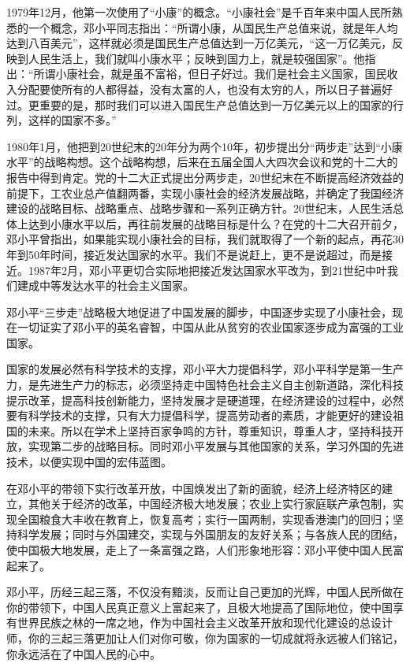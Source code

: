 \documentclass[cs4size,a4paper,nofonts]{ctexart}
\begin{document}
1979年12月，他第一次使用了“小康”的概念。“小康社会”是千百年来中国人民所熟悉的一个概念，邓小平同志指出：“所谓小康，从国民生产总值来说，就是年人均达到八百美元”，这样就必须是国民生产总值达到一万亿美元，“这一万亿美元，反映到人民生活上，我们就叫小康水平；反映到国力上，就是较强国家”。他指出：“所谓小康社会，就是虽不富裕，但日子好过。我们是社会主义国家，国民收入分配要使所有的人都得益，没有太富的人，也没有太穷的人，所以日子普遍好过。更重要的是，那时我们可以进入国民生产总值达到一万亿美元以上的国家的行列，这样的国家不多。”

1980年1月，他把到20世纪末的20年分为两个10年，初步提出分“两步走”达到“小康水平”的战略构想。这个战略构想，后来在五届全国人大四次会议和党的十二大的报告中得到肯定。党的十二大正式提出分两步走，20世纪末在不断提高经济效益的前提下，工农业总产值翻两番，实现小康社会的经济发展战略，并确定了我国经济建设的战略目标、战略重点、战略步骤和一系列正确方针。20世纪末，人民生活总体上达到小康水平以后，再往前发展的战略目标是什么？在党的十二大召开前夕，邓小平曾指出，如果能实现小康社会的目标，我们就取得了一个新的起点，再花30年到50年时间，接近发达国家的水平。我们不是说赶上，更不是说超过，而是接近。1987年2月，邓小平更切合实际地把接近发达国家水平改为，到21世纪中叶我们建成中等发达水平的社会主义国家。

邓小平“三步走”战略极大地促进了中国发展的脚步，中国逐步实现了小康社会，现在一切证实了邓小平的英名睿智，中国从此从贫穷的农业国家逐步成为富强的工业国家。

国家的发展必然有科学技术的支撑，邓小平大力提倡科学，邓小平科学是第一生产力，是先进生产力的标志，必须坚持走中国特色社会主义自主创新道路，深化科技提示改革，提高科技创新能力，坚持发展才是硬道理，在经济建设的过程中，必然要有科学技术的支撑，只有大力提倡科学，提高劳动者的素质，才能更好的建设祖国的未来。所以在学术上坚持百家争鸣的方针，尊重知识，尊重人才，坚持科技开放，实现第二步的战略目标。同时邓小平发展与其他国家的关系，学习外国的先进技术，以便实现中国的宏伟蓝图。

在邓小平的带领下实行改革开放，中国焕发出了新的面貌，经济上经济特区的建立，其他关于经济的改革，中国经济极大地发展；农业上实行家庭联产承包制，实现全国粮食大丰收在教育上，恢复高考；实行一国两制，实现香港澳门的回归；坚持科学发展；同时与外国建交，实现与外国朋友的友好关系；与各族人民的团结，使中国极大地发展，走上了一条富强之路，人们形象地形容：邓小平使中国人民富起来了。

邓小平，历经三起三落，不仅没有黯淡，反而让自己更加的光辉，中国人民所做在你的带领下，中国人民真正意义上富起来了，且极大地提高了国际地位，使中国享有世界民族之林的一席之地，作为中国社会主义改革开放和现代化建设的总设计师，你的三起三落更加让人们对你可敬，你为国家的一切成就将永远被人们铭记，你永远活在了中国人民的心中。
\end{document}
